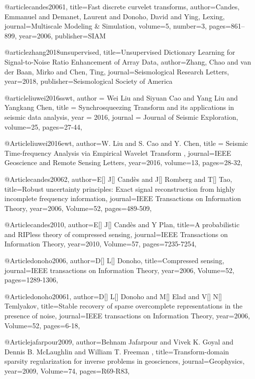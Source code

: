 @article{candes20061,
  title={Fast discrete curvelet transforms},
  author={Candes, Emmanuel and Demanet, Laurent and Donoho, David and Ying, Lexing},
  journal={Multiscale Modeling \& Simulation},
  volume={5},
  number={3},
  pages={861--899},
  year={2006},
  publisher={SIAM}
}

@article{zhang2018unsupervised,
  title={Unsupervised Dictionary Learning for Signal-to-Noise Ratio Enhancement of Array Data},
  author={Zhang, Chao and van der Baan, Mirko and Chen, Ting},
  journal={Seismological Research Letters},
  year={2018},
  publisher={Seismological Society of America}
}


@article{liuwei2016sswt,
  author =	 {Wei Liu and Siyuan Cao and Yang Liu and Yangkang Chen},
  title =	 {Synchrosqueezing Transform and its applications in seismic data analysis},
  year =	 2016,
  journal =	 {Journal of Seismic Exploration},
  volume={25},
 pages={27-44},
}

@Article{liuwei2016ewt,
  author={W. Liu and S. Cao and Y. Chen},
  title = {Seismic Time-frequency Analysis via Empirical Wavelet Transform
},
  journal={IEEE Geoscience and Remote Sensing Letters},
  year=2016,
  volume=13,
  pages={28-32},
}

@Article{candes20062,
  author={E[] J[] Cand\`{e}s and J[] Romberg and T[] Tao},
  title={Robust uncertainty principles: Exact signal reconstruction from highly incomplete frequency information},
  journal={IEEE Transactions on Information Theory},
  year=2006,
  Volume=52,
  pages={489-509},
}

@Article{candes2010,
  author={E[] J[] Cand\`{e}s and Y Plan},
  title={A probabilistic and RIPless theory of compressed sensing},
  journal={IEEE Transactions on Information Theory},
  year=2010,
  Volume=57,
  pages={7235-7254},
}


@Article{donoho2006,
  author={D[] L[] Donoho},
  title={Compressed sensing},
  journal={IEEE transactions on Information Theory},
  year=2006,
  Volume=52,
  pages={1289-1306},
}

@Article{donoho20061,
  author={D[] L[] Donoho and M[] Elad and V[] N[] Temlyakov},
  title={Stable recovery of sparse overcomplete representations in the presence of noise},
  journal={IEEE transactions on Information Theory},
  year=2006,
  Volume=52,
  pages={6-18},
}

@Article{jafarpour2009,
  author={Behnam Jafarpour and Vivek K. Goyal and Dennis B. McLaughlin and William T. Freeman },
  title={Transform-domain sparsity regularization for inverse problems in
geosciences},
  journal={Geophysics},
  year=2009,
  Volume=74,
  pages={R69-R83},
}

